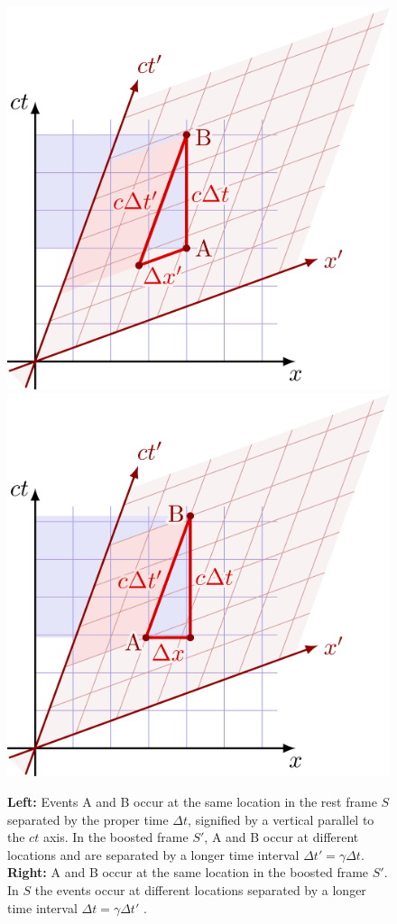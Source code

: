 \documentclass[a4paper]{article}
\begin{document}
\begin{figure}
    \centering
    \includegraphics[width=0.49\linewidth]{img/time dilation 2.png}
    \includegraphics[width=0.49\linewidth]{img/time dilation 3.png}
    \caption{\textbf{Left:} Events A and B occur at the same location in the rest frame $S$ separated by the proper time $\Delta t$, signified by a vertical parallel to the $ct$ axis. In the boosted frame $S'$, A and B occur at different locations and are separated by a longer time interval $\Delta t' = \gamma \Delta t$.
    \textbf{Right:} A and B occur at the same location in the boosted frame $S'$. In $S$ the events occur at different locations separated by a longer time interval $\Delta t = \gamma \Delta t'$ \cite{tikz}.}
    \label{fig:time-dilation}
\end{figure}




\end{document}
